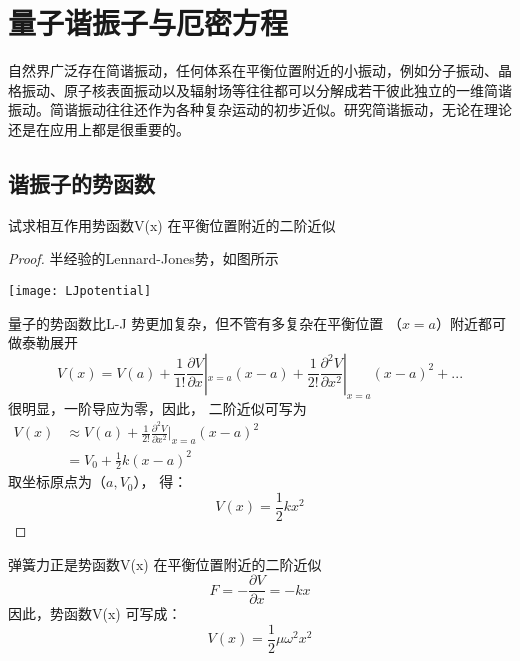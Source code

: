 
\section{量子谐振子与厄密方程}
自然界广泛存在简谐振动，任何体系在平衡位置附近的小振动，例如分子振动、晶格振动、原子核表面振动以及辐射场等往往都可以分解成若干彼此独立的一维简谐振动。简谐振动往往还作为各种复杂运动的初步近似。研究简谐振动，无论在理论还是在应用上都是很重要的。
\subsection{谐振子的势函数}
\begin{example} %
试求相互作用势函数V(x) 在平衡位置附近的二阶近似\\
\end{example}
\begin{proof}
半经验的Lennard-Jones势，如图所示\\
\centerline{\texttt{[image: LJpotential]}}  
量子的势函数比L-J 势更加复杂，但不管有多复杂在平衡位置 （$x=a$）附近都可做泰勒展开
 \begin{equation*}
V(x)=V(a) +\frac{1}{1!} \frac{\partial V}{\partial x} |_{x=a} (x-a) +\frac{1}{2!} \frac{\partial ^2 V}{\partial x ^2} |_{x=a} (x-a) ^2 + ... 
\end{equation*}
很明显，一阶导应为零，因此， 二阶近似可写为 \\
$\displaystyle  \begin{array}{lllllllll}
	V(x) &\approx V(a)+\frac{1}{2!} \frac{\partial ^2 V}{\partial x ^2} |_{x=a} (x-a) ^2   \\
	        & =V_0+\frac{1}{2} k (x-a) ^2 
\end{array}$\\
取坐标原点为（$a, V_0 $）， 得：\\
 \begin{equation*}
	V(x)=\frac{1}{2} k x^2 
\end{equation*}
\end{proof}
\begin{remark}
弹簧力正是势函数V(x) 在平衡位置附近的二阶近似\\
 \begin{equation*}
	F=-\frac{ \partial V}{\partial x}=-kx 
\end{equation*}	
因此，势函数V(x) 可写成：\\
  \begin{equation*}
 	V(x)=\frac{1}{2} \mu \omega ^2 x^2 
 \end{equation*}
\end{remark}


